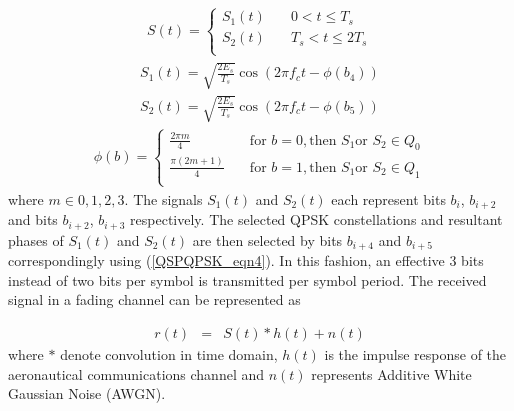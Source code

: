 \begin{eqnarray} \label{QSPQPSK_eqn1}
S(t) =
  \begin{cases}
    S_1(t) &\quad 0<t\leq{T_s} \\
    S_2(t) &\quad T_s<t\leq{2T_s}\\
  \end{cases}
\end{eqnarray}
\begin{eqnarray} \label{QSPQPSK_eqn2}
S_1(t) = \sqrt{\frac{2E_s}{T_s}}\cos(2\pi{f_c}t-\phi(b_4))
\end{eqnarray}
\begin{eqnarray} \label{QSPQPSK_eqn3}
S_2(t) = \sqrt{\frac{2E_s}{T_s}}\cos(2\pi{f_c}t-\phi(b_5))
\end{eqnarray}
\begin{eqnarray} \label{QSPQPSK_eqn4}
\phi(b) = 
  \begin{cases}
    \frac{2\pi{m}}{4} & \quad \text{for } b = 0, \text{then } S_1 \text{or } S_2 \in Q_0 \\
    \frac{\pi(2m+1)}{4} & \quad \text{for } b = 1, \text{then } S_1 \text{or } S_2 \in Q_1 \\
  \end{cases}
\end{eqnarray}
where $m\in{0,1,2,3}$. The signals $S_1(t)$ and $S_2(t)$ each represent bits $b_i$, $b_{i+2}$ and bits $b_{i+2}$, $b_{i+3}$ respectively. The selected QPSK constellations and resultant phases of $S_1(t)$ and $S_2(t)$ are then selected by bits $b_{i+4}$ and $b_{i+5}$ correspondingly using (\ref{QSPQPSK_eqn4}). In this fashion, an effective 3 bits instead of two bits per symbol is transmitted per symbol period. The received signal in a fading channel can be represented as

\begin{eqnarray} \label{QSPQPSK_eqn5}
r(t) & = & S(t)\ast{h(t)} + n(t)
\end{eqnarray}
where $\ast$ denote convolution in time domain, $h(t)$ is the impulse response of the aeronautical communications channel and $n(t)$ represents Additive White Gaussian Noise (AWGN).


